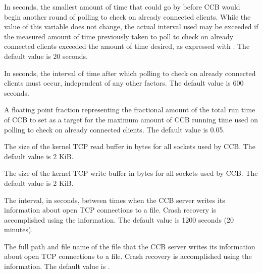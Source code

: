 \begin{description}
\label{param:CcbPollingInterval}
\item[\Macro{CCB\_POLLING\_INTERVAL}] In seconds, the smallest amount 
  of time that could go by before CCB would begin another round of polling to
  check on already connected clients.
  While the value of this variable does not change,
  the actual interval used may be exceeded if the measured amount 
  of time previously taken to poll to check on already connected clients 
  exceeded the amount of time desired, 
  as expressed with . 
  The default value is 20 seconds.

\label{param:CcbPollingMaxInterval}
\item[\Macro{CCB\_POLLING\_MAX\_INTERVAL}] In seconds, the interval of time
  after which polling to check on already connected clients must occur,
  independent of any other factors.
  The default value is 600 seconds.

\label{param:CcbPollingTimeslice}
\item[\Macro{CCB\_POLLING\_TIMESLICE}] A floating point fraction
  representing the fractional amount of the total run time of CCB
  to set as a target for the maximum amount of CCB running time used on 
  polling to check on already connected clients.
  The default value is 0.05.

\label{param:CcbReadBuffer}
\item[\Macro{CCB\_READ\_BUFFER}] The size of the kernel TCP read buffer 
  in bytes for all sockets used by CCB.
  The default value is 2 KiB.

\label{param:CcbWriteBuffer}
\item[\Macro{CCB\_WRITE\_BUFFER}] The size of the kernel TCP write buffer 
  in bytes for all sockets used by CCB.
  The default value is 2 KiB.

\label{param:CcbSweepInterval}
\item[\Macro{CCB\_SWEEP\_INTERVAL}]  The interval, in seconds,
  between times when the CCB server writes its information about 
  open TCP connections to a file. 
  Crash recovery is accomplished using the information.
  The default value is 1200 seconds (20 minutes).

\label{param:CcbReconnectFile}
\item[\Macro{CCB\_RECONNECT\_FILE}] The full path and file name of the
  file that the CCB server writes its information about 
  open TCP connections to a file.
  Crash recovery is accomplished using the information.
  The default value is .


\end{description}
